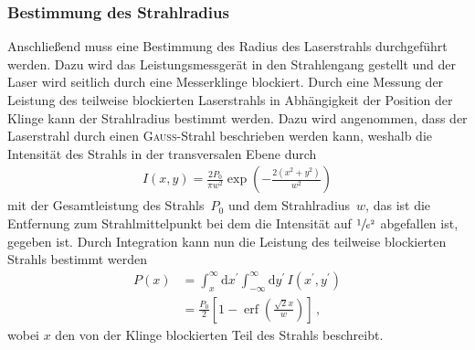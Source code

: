 \documentclass[11pt, a4paper]{article}
\numberwithin{equation}{section}
\DeclareMathOperator{\erf}{erf}
\begin{document}
\subsubsection{Bestimmung des Strahlradius}
\label{sec:strahlradius}
Anschließend muss eine Bestimmung des Radius des Laserstrahls durchgeführt werden.
Dazu wird das Leistungsmessgerät in den Strahlengang gestellt und der Laser wird seitlich durch eine Messerklinge blockiert.
Durch eine Messung der Leistung des teilweise blockierten Laserstrahls in Abhängigkeit der Position der Klinge kann der Strahlradius bestimmt werden.
Dazu wird angenommen, dass der Laserstrahl durch einen \textsc{Gauß}-Strahl beschrieben werden kann, weshalb die Intensität des Strahls in der transversalen Ebene durch
\begin{align*}
	I(x, y) = \frac{2 P_0}{\pi w^2} \exp\left(-\frac{2 (x^2 + y^2)}{w^2} \right)
\end{align*}
mit der Gesamtleistung des Strahls~$P_0$ und dem Strahlradius~$w$, das ist die Entfernung zum Strahlmittelpunkt bei dem die Intensität auf $\sfrac{1}{e^2}$ abgefallen ist, gegeben ist.
Durch Integration kann nun die Leistung des teilweise blockierten Strahls bestimmt werden
\begin{align}
	P(x) &= \int_{x}^{\infty} \mathrm{d}x^\prime \int_{-\infty}^{\infty} \mathrm{d}y^\prime \, I(x^\prime, y^\prime) \\
	     &= \frac{P_0}{2} \left[ 1 - \erf\left( \frac{\sqrt{2} x}{w}\right) \right] \, \text{,}
	\label{eq:erf_fit}
\end{align}
wobei $x$ den von der Klinge blockierten Teil des Strahls beschreibt.
\end{document}
